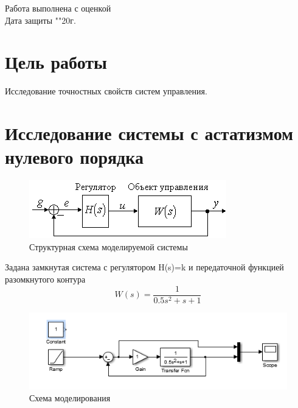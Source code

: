 \documentclass[a4paper, 11pt]{article}
\begin{document}
\begin{titlepage}
		Работа выполнена с оценкой \hspace{1cm} \underline{\hspace{8cm}} \\ 
		\vspace{1cm}
		Дата защиты "\underline{\hspace{0.7cm}}"\hspace{0.2cm}\underline{\hspace{2cm}}\hspace{0.2cm}20\underline{\hspace{0.7cm}}г.

\end{titlepage}

\section*{Цель работы}
Исследование точностных свойств систем управления.

\section{Исследование системы с астатизмом нулевого порядка}
\begin{figure}[h]
	\centering
	\includegraphics[width=0.7\linewidth]{11.png}
	\caption{Структурная схема моделируемой системы}
	\label{fig:3}
\end{figure}

Задана замкнутая система с регулятором H(s)=k и передаточной функцией разомкнутого контура %
\[W(s) = \frac{1}{{0.5{s^2} + s + 1}}\]

\begin{figure}[h]
	\centering
	\includegraphics[width=0.7\linewidth]{12}
	\caption{Схема моделирования}
	\label{fig:12}
\end{figure}
\end{document}
